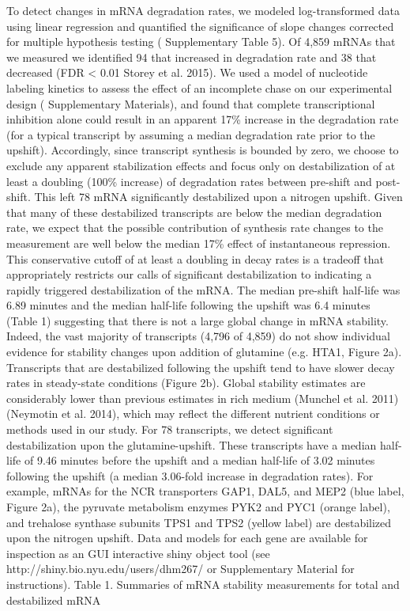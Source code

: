 To detect changes in mRNA degradation rates, we modeled
log-transformed data using linear regression and quantified the
significance of slope changes corrected for multiple hypothesis
testing ( Supplementary Table 5). Of 4,859 mRNAs that we measured we
identified 94 that increased in degradation rate and 38 that decreased
(FDR < 0.01 Storey et al. 2015). We used a model of nucleotide
labeling kinetics to assess the effect of an incomplete chase on our
experimental design ( Supplementary Materials), and found that
complete transcriptional inhibition alone could result in an apparent
17\% increase in the degradation rate (for a typical transcript by
assuming a median degradation rate prior to the upshift). Accordingly,
since transcript synthesis is bounded by zero, we choose to exclude
any apparent stabilization effects and focus only on destabilization
of at least a doubling (100\% increase) of degradation rates between
pre-shift and post-shift. This left 78 mRNA significantly destabilized
upon a nitrogen upshift. Given that many of these destabilized
transcripts are below the median degradation rate, we expect that the
possible contribution of synthesis rate changes to the measurement are
well below the median 17\% effect of instantaneous repression. This
conservative cutoff of at least a doubling in decay rates is a
tradeoff that appropriately restricts our calls of significant
destabilization to indicating a rapidly triggered destabilization of
the mRNA.  The median pre-shift half-life was 6.89 minutes and the
median half-life following the upshift was 6.4 minutes (Table 1)
suggesting that there is not a large global change in mRNA stability.
Indeed, the vast majority of transcripts (4,796 of 4,859) do not show
individual evidence for stability changes upon addition of glutamine
(e.g.  HTA1, Figure 2a). Transcripts that are destabilized following
the upshift tend to have slower decay rates in steady-state conditions
(Figure 2b). Global stability estimates are considerably lower than
previous estimates in rich medium (Munchel et al. 2011) (Neymotin et
al. 2014), which may reflect the different nutrient conditions or
methods used in our study. For 78 transcripts, we detect significant
destabilization upon the glutamine-upshift. These transcripts have a
median half-life of 9.46 minutes before the upshift and a median
half-life of 3.02 minutes following the upshift (a median 3.06-fold
increase in degradation rates). For example, mRNAs for the NCR
transporters GAP1, DAL5, and MEP2 (blue label, Figure 2a), the
pyruvate metabolism enzymes PYK2 and PYC1 (orange label), and
trehalose synthase subunits TPS1 and TPS2 (yellow label) are
destabilized upon the nitrogen upshift. Data and models for each gene
are available for inspection as an GUI interactive shiny object tool
(see http://shiny.bio.nyu.edu/users/dhm267/ or Supplementary Material
for instructions).  Table 1. Summaries of mRNA stability measurements
for  total and destabilized mRNA


